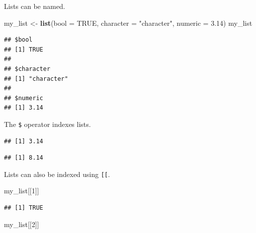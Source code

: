 \documentclass[
  openany]{book}
\newenvironment{Shaded}{\begin{snugshade}}{\end{snugshade}}
\newcommand{\DataTypeTok}[1]{\textcolor[rgb]{0.13,0.29,0.53}{#1}}
\newcommand{\DecValTok}[1]{\textcolor[rgb]{0.00,0.00,0.81}{#1}}
\newcommand{\FloatTok}[1]{\textcolor[rgb]{0.00,0.00,0.81}{#1}}
\newcommand{\KeywordTok}[1]{\textcolor[rgb]{0.13,0.29,0.53}{\textbf{#1}}}
\newcommand{\NormalTok}[1]{#1}
\newcommand{\OperatorTok}[1]{\textcolor[rgb]{0.81,0.36,0.00}{\textbf{#1}}}
\newcommand{\OtherTok}[1]{\textcolor[rgb]{0.56,0.35,0.01}{#1}}
\newcommand{\StringTok}[1]{\textcolor[rgb]{0.31,0.60,0.02}{#1}}
\begin{document}
Lists can be named.

\begin{Shaded}
\begin{Highlighting}[]
\NormalTok{my_list <-}\StringTok{ }\KeywordTok{list}\NormalTok{(}\DataTypeTok{bool =} \OtherTok{TRUE}\NormalTok{, }\DataTypeTok{character =} \StringTok{"character"}\NormalTok{, }\DataTypeTok{numeric =} \FloatTok{3.14}\NormalTok{)}
\NormalTok{my_list}
\end{Highlighting}
\end{Shaded}

\begin{verbatim}
## $bool
## [1] TRUE
## 
## $character
## [1] "character"
## 
## $numeric
## [1] 3.14
\end{verbatim}

The \texttt{\$} operator indexes lists.

\begin{Shaded}
\end{Shaded}

\begin{verbatim}
## [1] 3.14
\end{verbatim}

\begin{Shaded}
\end{Shaded}

\begin{verbatim}
## [1] 8.14
\end{verbatim}

Lists can also be indexed using \texttt{{[}{[}}.

\begin{Shaded}
\begin{Highlighting}[]
\NormalTok{my_list[[}\DecValTok{1}\NormalTok{]]}
\end{Highlighting}
\end{Shaded}

\begin{verbatim}
## [1] TRUE
\end{verbatim}

\begin{Shaded}
\begin{Highlighting}[]
\NormalTok{my_list[[}\DecValTok{2}\NormalTok{]]}
\end{Highlighting}
\end{Shaded}
\end{document}
